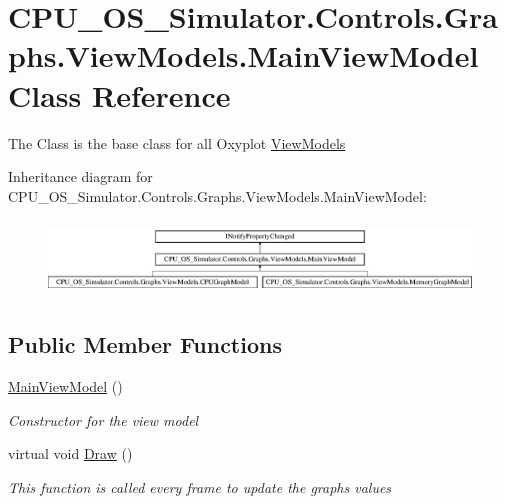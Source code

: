 \hypertarget{class_c_p_u___o_s___simulator_1_1_controls_1_1_graphs_1_1_view_models_1_1_main_view_model}{}\section{C\+P\+U\+\_\+\+O\+S\+\_\+\+Simulator.\+Controls.\+Graphs.\+View\+Models.\+Main\+View\+Model Class Reference}
\label{class_c_p_u___o_s___simulator_1_1_controls_1_1_graphs_1_1_view_models_1_1_main_view_model}


The Class is the base class for all Oxyplot \hyperlink{namespace_c_p_u___o_s___simulator_1_1_controls_1_1_graphs_1_1_view_models}{View\+Models}  


Inheritance diagram for C\+P\+U\+\_\+\+O\+S\+\_\+\+Simulator.\+Controls.\+Graphs.\+View\+Models.\+Main\+View\+Model\+:\begin{figure}[H]
\begin{center}
\leavevmode
\includegraphics[height=2.009569cm]{class_c_p_u___o_s___simulator_1_1_controls_1_1_graphs_1_1_view_models_1_1_main_view_model}
\end{center}
\end{figure}
\subsection*{Public Member Functions}
\begin{DoxyCompactItemize}
\item 
\hyperlink{class_c_p_u___o_s___simulator_1_1_controls_1_1_graphs_1_1_view_models_1_1_main_view_model_ab21f8ddc0684d7e00d6a29edc25f9aa6}{Main\+View\+Model} ()
\begin{DoxyCompactList}\small\item\em Constructor for the view model \end{DoxyCompactList}\item 
virtual void \hyperlink{class_c_p_u___o_s___simulator_1_1_controls_1_1_graphs_1_1_view_models_1_1_main_view_model_a4dca443f8fa6f7ae0207fc487eef5295}{Draw} ()
\begin{DoxyCompactList}\small\item\em This function is called every frame to update the graph\textquotesingle{}s values \end{DoxyCompactList}\end{DoxyCompactItemize}
